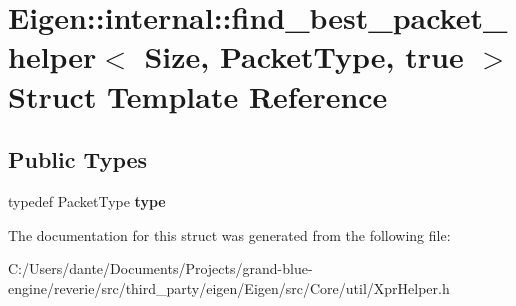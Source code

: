 \hypertarget{struct_eigen_1_1internal_1_1find__best__packet__helper_3_01_size_00_01_packet_type_00_01true_01_4}{}\section{Eigen\+::internal\+::find\+\_\+best\+\_\+packet\+\_\+helper$<$ Size, Packet\+Type, true $>$ Struct Template Reference}
\label{struct_eigen_1_1internal_1_1find__best__packet__helper_3_01_size_00_01_packet_type_00_01true_01_4}
\subsection*{Public Types}
\begin{DoxyCompactItemize}
\item 
\mbox{\label{struct_eigen_1_1internal_1_1find__best__packet__helper_3_01_size_00_01_packet_type_00_01true_01_4_a3f50d58b34c3bd7e4ff3311e5b30ac91}} 
typedef Packet\+Type {\bfseries type}
\end{DoxyCompactItemize}


The documentation for this struct was generated from the following file\+:\begin{DoxyCompactItemize}
\item 
C\+:/\+Users/dante/\+Documents/\+Projects/grand-\/blue-\/engine/reverie/src/third\+\_\+party/eigen/\+Eigen/src/\+Core/util/Xpr\+Helper.\+h\end{DoxyCompactItemize}
